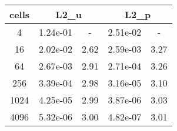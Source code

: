 \documentclass[10pt]{report}
\begin{document}
\begin{table}[H]
\begin{center}
\begin{tabular}{|c|c|c|c|c|} \hline
cells & 
\multicolumn{2}{|c|}{L2_u} & 
\multicolumn{2}{|c|}{L2_p}\\ \hline
4 & 1.24e-01 & - & 2.51e-02 & -\\ \hline
16 & 2.02e-02 & 2.62 & 2.59e-03 & 3.27\\ \hline
64 & 2.67e-03 & 2.91 & 2.71e-04 & 3.26\\ \hline
256 & 3.39e-04 & 2.98 & 3.16e-05 & 3.10\\ \hline
1024 & 4.25e-05 & 2.99 & 3.87e-06 & 3.03\\ \hline
4096 & 5.32e-06 & 3.00 & 4.82e-07 & 3.01\\ \hline
\end{tabular}
\end{center}
\end{table}
\end{document}
